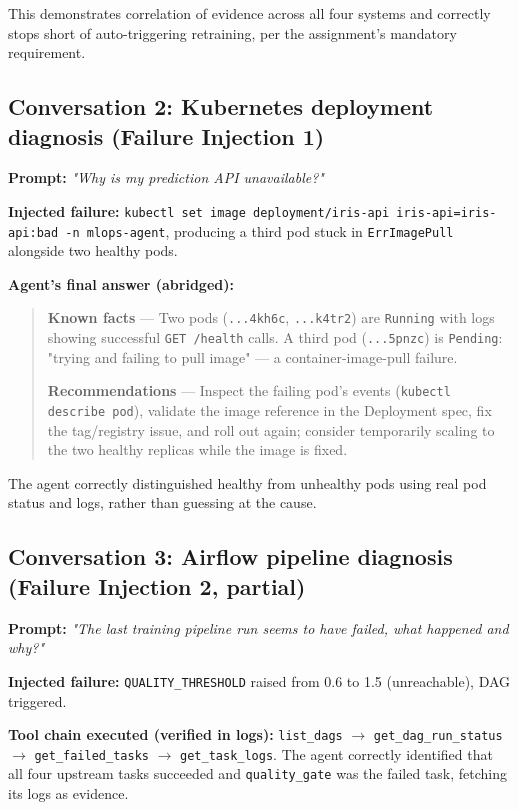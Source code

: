 \documentclass[11pt,a4paper]{article}
\begin{document}
This demonstrates correlation of evidence across all four systems and
correctly stops short of auto-triggering retraining, per the assignment's
mandatory requirement.

\subsection{Conversation 2: Kubernetes deployment diagnosis (Failure Injection 1)}

\textbf{Prompt:} \textit{"Why is my prediction API unavailable?"}

\textbf{Injected failure:} \texttt{kubectl set image deployment/iris-api
iris-api=iris-api:bad -n mlops-agent}, producing a third pod stuck in
\texttt{ErrImagePull} alongside two healthy pods.

\textbf{Agent's final answer (abridged):}
\begin{quote}
\small
\textbf{Known facts} --- Two pods (\texttt{...4kh6c}, \texttt{...k4tr2}) are
\texttt{Running} with logs showing successful \texttt{GET /health} calls. A
third pod (\texttt{...5pnzc}) is \texttt{Pending}: "trying and failing to
pull image" --- a container-image-pull failure.

\textbf{Recommendations} --- Inspect the failing pod's events
(\texttt{kubectl describe pod}), validate the image reference in the
Deployment spec, fix the tag/registry issue, and roll out again; consider
temporarily scaling to the two healthy replicas while the image is fixed.
\end{quote}

The agent correctly distinguished healthy from unhealthy pods using real
pod status and logs, rather than guessing at the cause.

\subsection{Conversation 3: Airflow pipeline diagnosis (Failure Injection 2, partial)}

\textbf{Prompt:} \textit{"The last training pipeline run seems to have
failed, what happened and why?"}

\textbf{Injected failure:} \texttt{QUALITY\_THRESHOLD} raised from 0.6 to
1.5 (unreachable), DAG triggered.

\textbf{Tool chain executed (verified in logs):} \texttt{list\_dags} $\to$
\texttt{get\_dag\_run\_status} $\to$ \texttt{get\_failed\_tasks} $\to$
\texttt{get\_task\_logs}. The agent correctly identified that all four
upstream tasks succeeded and \texttt{quality\_gate} was the failed task,
fetching its logs as evidence.
\end{document}
